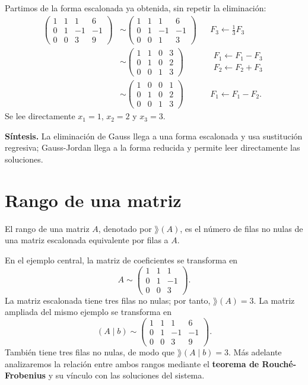 \documentclass[compacto,10pt]{pubciencias-notas}
\begin{document}
\begin{ejem}
Partimos de la forma escalonada ya obtenida, sin repetir la eliminación:
\begin{align*}
\left(\begin{array}{ccc|c}1&1&1&6\\0&1&-1&-1\\0&0&3&9\end{array}\right)
&\sim
\left(\begin{array}{ccc|c}1&1&1&6\\0&1&-1&-1\\0&0&1&3\end{array}\right)
&&F_3\leftarrow\frac{1}{3}F_3\\
&\sim
\left(\begin{array}{ccc|c}1&1&0&3\\0&1&0&2\\0&0&1&3\end{array}\right)
&&\begin{array}{l}F_1\leftarrow F_1-F_3\\F_2\leftarrow F_2+F_3\end{array}\\
&\sim
\left(\begin{array}{ccc|c}1&0&0&1\\0&1&0&2\\0&0&1&3\end{array}\right)
&&F_1\leftarrow F_1-F_2.
\end{align*}
Se lee directamente $x_1=1$, $x_2=2$ y $x_3=3$.
\end{ejem}

\noindent\textbf{Síntesis.} La eliminación de Gauss llega a una forma escalonada y usa sustitución regresiva;
Gauss-Jordan llega a la forma reducida y permite leer directamente las soluciones.

\section{Rango de una matriz}
\begin{defi}[Rango]
El rango de una matriz $A$, denotado por $\rang(A)$, es el número de filas
no nulas de una matriz escalonada equivalente por filas a $A$.
\end{defi}

En el ejemplo central, la matriz de coeficientes se transforma en
\[
A\sim\begin{pmatrix}1&1&1\\0&1&-1\\0&0&3\end{pmatrix}.
\]
La matriz escalonada tiene tres filas no nulas; por tanto, $\rang(A)=3$.
La matriz ampliada del mismo ejemplo se transforma en
\[
(A\mid b)\sim
\left(\begin{array}{ccc|c}
1&1&1&6\\0&1&-1&-1\\0&0&3&9
\end{array}\right).
\]
También tiene tres filas no nulas, de modo que $\rang(A\mid b)=3$.
Más adelante analizaremos la relación entre ambos rangos mediante el
\textbf{teorema de Rouché-Frobenius} y su vínculo con las soluciones del sistema.
\end{document}
